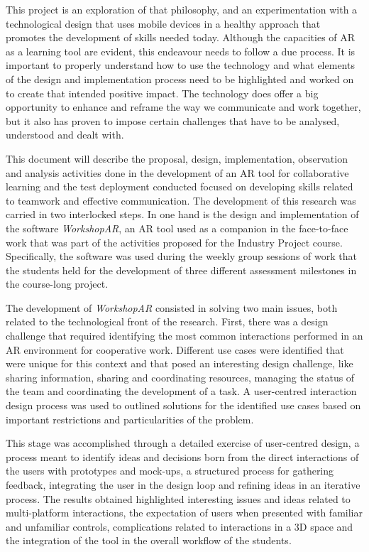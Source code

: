 This project is an exploration of that philosophy, and an experimentation with a technological design that uses mobile devices in a healthy approach that promotes the development of skills
needed today. Although the capacities of \ac{AR} as a learning tool are evident, this endeavour needs to follow a due process. It is important to properly understand how to use the
technology and what elements of the design and implementation process need to be highlighted and worked on to create that intended positive impact. The technology does offer a big
opportunity to enhance and reframe the way we communicate and work together, but it also has proven to impose certain challenges that have to be analysed, understood and dealt with.

This document will describe the proposal, design, implementation, observation and analysis activities done in the development of an \ac{AR} tool for collaborative learning and the test
deployment conducted focused on developing skills related to teamwork and effective communication.  The development of this research was carried in two interlocked steps. In one hand is
the design and implementation of the software \emph{WorkshopAR}, an \ac{AR} tool used as a companion in the face-to-face work that was part of the activities proposed for the Industry Project
course. Specifically, the software was used during the weekly group sessions of work that the students held for the development of three different assessment milestones in the course-long
project.

The development of \emph{WorkshopAR} consisted in solving two main issues, both related to the technological front of the research. First, there was a design challenge that required identifying
the most common interactions performed in an \ac{AR} environment for cooperative work. Different use cases were identified that were unique for this context and that posed an interesting
design challenge, like sharing information, sharing and coordinating resources, managing the status of the team and coordinating the development of a task. A user-centred interaction design
process was used to outlined solutions for the identified use cases based on important restrictions and particularities of the problem.

This stage was accomplished through a detailed exercise of user-centred design, a process meant to identify ideas and decisions born from the direct interactions of the users with
prototypes and mock-ups, a structured process for gathering feedback, integrating the user in the design loop and refining ideas in an iterative process. The results obtained highlighted
interesting issues and ideas related to multi-platform interactions, the expectation of users when presented with familiar and unfamiliar controls, complications related to interactions in
a 3D space and the integration of the tool in the overall workflow of the students.

